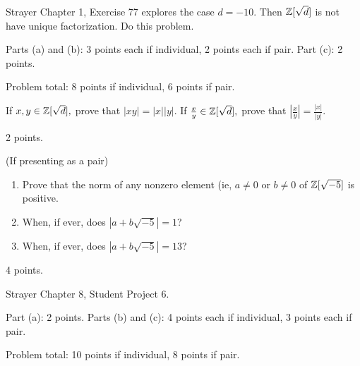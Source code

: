 \documentclass[letterpaper, 11 pt,handout]{ximera}
\begin{document}
\begin{exploration}
\begin{problem}
 	Strayer Chapter 1, Exercise 77 explores the case $d=-10.$ Then $\mathbb Z[\sqrt{d}]$ is not have unique factorization. Do this problem. 
\begin{rubric}
 Parts (a) and (b): 3 points each if individual, 2 points each if pair. Part (c): 2 points.
 
 Problem total: 8 points if individual, 6 points if pair.
\end{rubric}
\end{problem}

\begin{problem}
	If $x,y\in\mathbb Z[\sqrt{d}],$ prove that $|xy|=|x||y|.$ If $\frac{x}{y}\in\mathbb Z[\sqrt{d}],$ prove that $\left|\frac{x}{y}\right|=\frac{|x|}{|y|}.$ 
\begin{rubric}
2 points.
\end{rubric}
\end{problem}

\begin{problem}(If presenting as a pair) 
	\begin{enumerate}
 		\item Prove that the norm of any nonzero element (ie, $a\neq 0$ or $b\neq 0$ of $\mathbb Z[\sqrt{-5}]$ is positive.
		
		\item When, if ever, does $|a+b\sqrt{-5}|=1$?
		
		\item When, if ever, does $|a+b\sqrt{-5}|=13$?
	\end{enumerate}
\begin{rubric}
4 points.
\end{rubric}	
\end{problem}



\begin{problem}
	Strayer Chapter 8, Student Project 6.
\begin{rubric}
 Part (a): 2 points. Parts (b) and (c): 4 points each if individual, 3 points each if pair.
 
 Problem total: 10 points if individual, 8 points if pair.
\end{rubric}
\end{problem}
\end{exploration}
\end{document}
